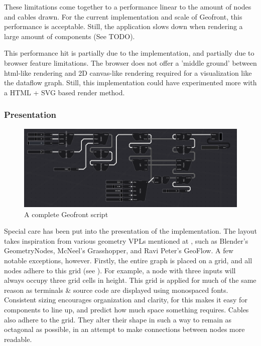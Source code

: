 These limitations come together to a performance linear to the amount of nodes and cables drawn. For the current implementation and scale of Geofront, this performance is acceptable.  
Still, the application slows down when rendering a large amount of components (See TODO). 


This performance hit is partially due to the implementation, and partially due to browser feature limitations. 
The browser does not offer a 'middle ground' between html-like rendering and 2D canvas-like rendering required for a visualization like the dataflow graph. 
Still, this implementation could have experimented more with a HTML + SVG based render method.

\subsubsection*{Presentation}

\begin{figure}
  \centering
  \graphicspath{ {../../assets/images/implementation/} }
  \includegraphics[width=\linewidth]{a-full-graph.png}
  \caption[Shim Classes]{A complete Geofront script}
  \label{fig:a-full-graph}
\end{figure}

Special care has been put into the presentation of the implementation.
The layout takes inspiration from various geometry VPLs mentioned at , such as Blender's GeometryNodes, McNeel's Grasshopper, and Ravi Peter's GeoFlow. 
A few notable exceptions, however. 
Firstly, the entire graph is placed on a grid, and all nodes adhere to this grid (see ). 
For example, a node with three inputs will always occupy three grid cells in height. 
This grid is applied for much of the same reason as terminals \& source code are displayed using monospaced fonts. 
Consistent sizing encourages organization and clarity, for this makes it easy for components to line up, and predict how much space something requires.  
Cables also adhere to the grid. They alter their shape in such a way to remain as octagonal as possible, in an attempt to make connections between nodes more readable.

